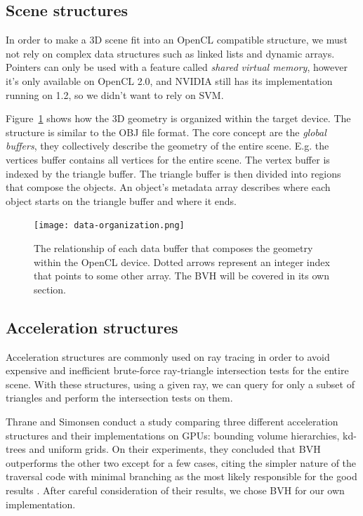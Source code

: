 \documentclass{vgtc}
\begin{document}
\subsection{Scene structures}

In order to make a 3D scene fit into an OpenCL compatible structure,
we must not rely on complex data structures such as linked lists and
dynamic arrays. Pointers can only be used with a feature called
\emph{shared virtual memory}, however it's only available on OpenCL
2.0, and NVIDIA still has its implementation running on 1.2, so we
didn't want to rely on SVM.

Figure~\ref{fig:data-org} shows how the 3D geometry is organized
within the target device. The structure is similar to the OBJ file
format. The core concept are the \emph{global buffers}, they
collectively describe the geometry of the entire scene. E.g. the
vertices buffer contains all vertices for the entire scene. The vertex
buffer is indexed by the triangle buffer. The triangle buffer is then
divided into regions that compose the objects. An object's metadata
array describes where each object starts on the triangle buffer and
where it ends.

\begin{figure}
\centering
\texttt{[image: data-organization.png]}
\caption{The relationship of each data buffer that composes the
  geometry within the OpenCL device. Dotted arrows represent an
  integer index that points to some other array. The BVH will be
  covered in its own section.}
\label{fig:data-org}
\end{figure}


\subsection{Acceleration structures}

Acceleration structures are commonly used on ray tracing in order to
avoid expensive and inefficient brute-force ray-triangle intersection
tests for the entire scene. With these structures, using a given ray,
we can query for only a subset of triangles and perform the
intersection tests on them.

Thrane and Simonsen conduct a study comparing three different
acceleration structures and their implementations on GPUs: bounding
volume hierarchies, kd-trees and uniform grids. On their experiments,
they concluded that BVH outperforms the other two except for a few
cases, citing the simpler nature of the traversal code with minimal
branching as the most likely responsible for the good results
\cite{Thrane}. After careful consideration of their results, we chose
BVH for our own implementation.
\end{document}
